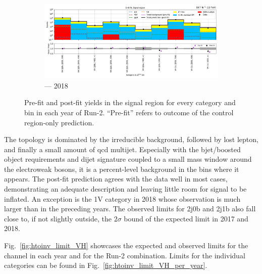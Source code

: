 \begin{figure}[htbp]
    \begin{subfigure}[b]{0.9\textwidth}
        \includegraphics[width=\textwidth]{figures/mountain_ranges/2018/VH/SR_tree_fit_s-abs_values_VH_cats.pdf}
        \caption{\VH --- 2018}
    \end{subfigure}
    \caption[Pre-fit and post-fit yields in the signal region for every \VH category and \ptmiss bin in each year of Run-2]{Pre-fit and post-fit yields in the signal region for every \VH category and \ptmiss bin in each year of Run-2. ``Pre-fit'' refers to outcome of the control region-only prediction.}
    \label{fig:htoinv_mountain_range_VH_SR_Postfit}
\end{figure}

The \VH topology is dominated by the irreducible \ztonunupjets background, followed by lost lepton, and finally a small amount of \acrshort{qcd} multijet. Especially with the \gls{bjet}/boosted object requirements and dijet signature coupled to a small mass window around the electroweak bosons, it is a percent-level background in the bins where it appears. The post-fit prediction agrees with the data well in most cases, demonstrating an adequate description and leaving little room for signal to be inflated. An exception is the 1V category in 2018 whose observation is much larger than in the preceding years. The observed limits for 2j0b and 2j1b also fall close to, if not slightly outside, the $\text{2}\sigma$ bound of the expected limit in 2017 and 2018.

Fig.~\ref{fig:htoinv_limit_VH} showcases the expected and observed limits for the \VH channel in each year and for the Run-2 combination. Limits for the individual categories can be found in Fig.~\ref{fig:htoinv_limit_VH_per_year}.

